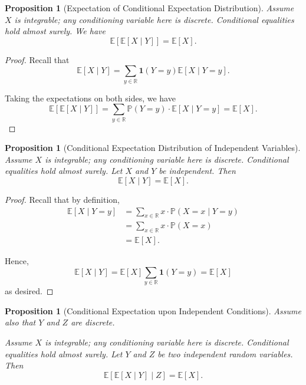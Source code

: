\documentclass[11pt]{article}
\numberwithin{equation}{section}
\newtheorem{proposition}[theorem]{Proposition}
\theoremstyle{definition}
\theoremstyle{remark}
\newcommand{\pqty}[1]{\left(#1\right)}
\newcommand{\bqty}[1]{\left[#1\right]}
\newcommand{\RR}{\mathbb R}
\newcommand{\indicator}{\mathbf 1}
\newcommand{\Prob}{\mathbb P}
\newcommand{\Expt}{\mathbb E}
\newcommand{\Conditional}[2]{#1\mid #2}
\begin{document}
\begin{proposition}[Expectation of Conditional Expectation Distribution]\label{probability-proposition-019}
    \label{probability-prop:expectation-conditional-expectation-distribution}
Assume \(X\) is integrable; any conditioning variable here is discrete. Conditional equalities hold almost surely.
%
    We have
    \[
        \Expt\bqty{\Expt\bqty{\Conditional{X}{Y}}} = \Expt\bqty{X}.
    \]
\end{proposition}

\begin{proof}\label{probability-proof-035}
    Recall that
    \[
        \Expt\bqty{\Conditional{X}{Y}} = \sum_{y \in \RR} \indicator\pqty{Y = y} \Expt\bqty{\Conditional{X}{Y = y}}.
    \]

    Taking the expectations on both sides, we have
    \[
        \Expt\bqty{\Expt\bqty{\Conditional{X}{Y}}} = \sum_{y \in \RR} \Prob\pqty{Y = y} \cdot \Expt\bqty{\Conditional{X}{Y = y}} = \Expt\bqty{X}.
    \]
\end{proof}

\begin{proposition}[Conditional Expectation Distribution of Independent Variables]\label{probability-proposition-020}
    \label{probability-prop:conditional-expectation-distribution-independent}
Assume \(X\) is integrable; any conditioning variable here is discrete. Conditional equalities hold almost surely.
%
    Let \(X\) and \(Y\) be independent. Then
    \[
        \Expt\bqty{\Conditional{X}{Y}} = \Expt\bqty{X}.
    \]
\end{proposition}

\begin{proof}\label{probability-proof-036}
    Recall that by definition,
    \begin{align*}
        \Expt\bqty{\Conditional{X}{Y = y}} &= \sum_{x \in \RR} x \cdot \Prob\pqty{\Conditional{X = x}{Y = y}} \\
        &= \sum_{x \in \RR} x \cdot \Prob\pqty{X = x} \\
        &= \Expt\bqty{X}.
    \end{align*}

    Hence,
    \[
        \Expt\bqty{\Conditional{X}{Y}} = \Expt\bqty{X} \sum_{y \in \RR} \indicator\pqty{Y = y} = \Expt\bqty{X}
    \]
    as desired.
\end{proof}

\begin{proposition}[Conditional Expectation upon Independent Conditions]\label{probability-proposition-021}
    \label{probability-prop:conditional-expectation-independent-conditions}
Assume also that \(Y\) and \(Z\) are discrete.

Assume \(X\) is integrable; any conditioning variable here is discrete. Conditional equalities hold almost surely.
%
    Let \(Y\) and \(Z\) be two independent random variables. Then
    \[
        \Expt\bqty{\Conditional{\Expt\bqty{\Conditional{X}{Y}}}{Z}} = \Expt\bqty{X}.
    \]
\end{proposition}
\end{document}
